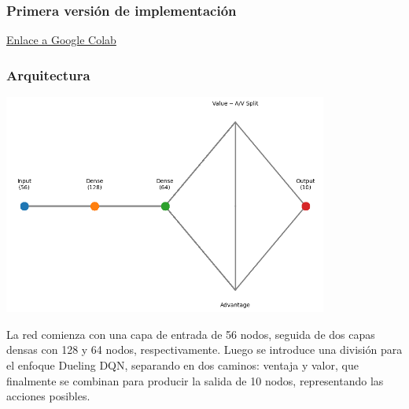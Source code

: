\documentclass[10pt]{beamer}
\begin{document}
\begin{frame}
  \frametitle{Primera versión de implementación}
  \href{https://colab.research.google.com/drive/1Q0qbUixrir5GWn5auAH5yfjDvS-Opwcd?usp=sharing}{Enlace a Google Colab}


  
\end{frame}

\begin{frame}
\frametitle{Arquitectura} %
\centering %
\includegraphics[width=0.8\textwidth]{descarga.png} %
\end{frame}

\begin{frame}
 La red comienza con una capa de entrada de 56 nodos, seguida de dos capas densas con 128 y 64 nodos, respectivamente. Luego se introduce una división para el enfoque Dueling DQN, separando en dos caminos: ventaja y valor, que finalmente se combinan para producir la salida de 10 nodos, representando las acciones posibles. ​
\end{frame}
\end{document}
